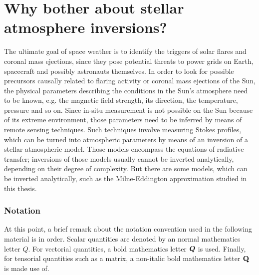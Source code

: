 \documentclass[a4paper,12pt]{report}
\begin{document}
\section{Why bother about stellar atmosphere inversions?}
The ultimate goal of space weather is to identify the triggers of solar flares and coronal mass ejections, since they pose potential threats to power grids on Earth, spacecraft and possibly astronauts themselves. In order to look for possible precursors causally related to flaring activity or coronal mass ejections of the Sun, the physical parameters describing the conditions in the Sun's atmosphere need to be known, e.g. the magnetic field strength, its direction, the temperature, pressure and so on. Since in-situ measurement is not possible on the Sun because of its extreme environment, those parameters need to be inferred by means of remote sensing techniques. Such techniques involve measuring Stokes profiles, which can be turned into atmospheric parameters by means of an inversion of a stellar atmospheric model. Those models encompass the equations of radiative transfer; inversions of those models usually cannot be inverted analytically, depending on their degree of complexity. But there are some models, which can be inverted analytically, such as the Milne-Eddington approximation studied in this thesis.








\subsubsection{Notation}
At this point, a brief remark about the notation convention used in the following material is in order. Scalar quantities are denoted by an normal mathematics letter $Q$. For vectorial quantities, a bold mathematics letter $\bm{Q}$ is used. Finally, for tensorial quantities such as a matrix, a non-italic bold mathematics letter $\boldsymbol{\mathbf{Q}}$ is made use of.
\end{document}
